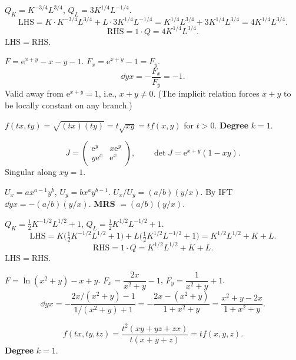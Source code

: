 \begin{solutions}
  \item $Q_{K}=K^{-3/4}L^{3/4}$, $Q_{L}=3K^{1/4}L^{-1/4}$.
        \[
          \mathrm{LHS}=K\cdot K^{-3/4}L^{3/4}+L\cdot 3K^{1/4}L^{-1/4}
            =K^{1/4}L^{3/4}+3K^{1/4}L^{3/4}=4K^{1/4}L^{3/4} .
        \]
        \[
          \mathrm{RHS}=1\cdot Q=4K^{1/4}L^{3/4} .
        \]
        $\mathrm{LHS}=\mathrm{RHS}$. \checkmark

  \item $F=\mathrm{e}^{x+y}-x-y-1$. $F_{x}=\mathrm{e}^{x+y}-1=F_{y}$.
        \[
          \dd{y}{x} = -\frac{F_{x}}{F_{y}} = -1 .
        \]
        Valid away from $\mathrm{e}^{x+y}=1$, i.e., $x+y\neq 0$. (The
        implicit relation forces $x+y$ to be locally constant on any
        branch.)

  \item $f(tx,ty)=\sqrt{(tx)(ty)}=t\sqrt{xy}=t f(x,y)$ for $t>0$.
        \textbf{Degree} $k=1$.

  \item
        \[
          J=\begin{pmatrix} \mathrm{e}^{y} & x\mathrm{e}^{y}\\
                             y\mathrm{e}^{x} & \mathrm{e}^{x}\end{pmatrix},
          \qquad \det J=\mathrm{e}^{x+y}(1-xy) .
        \]
        Singular along $xy=1$.

  \item $U_{x}=ax^{a-1}y^{b}$, $U_{y}=bx^{a}y^{b-1}$.
        $U_{x}/U_{y}=(a/b)(y/x)$. By IFT $\dd{y}{x}=-(a/b)(y/x)$.
        \textbf{MRS} $=(a/b)(y/x)$.

  \item $Q_{K}=\tfrac12K^{-1/2}L^{1/2}+1$, $Q_{L}=\tfrac12K^{1/2}L^{-1/2}+1$.
        \[
          \mathrm{LHS}=K\bigl(\tfrac12K^{-1/2}L^{1/2}+1\bigr)
            +L\bigl(\tfrac12K^{1/2}L^{-1/2}+1\bigr)=K^{1/2}L^{1/2}+K+L .
        \]
        \[
          \mathrm{RHS}=1\cdot Q=K^{1/2}L^{1/2}+K+L .
        \]
        $\mathrm{LHS}=\mathrm{RHS}$. \checkmark

  \item $F=\ln(x^{2}+y)-x+y$. $F_{x}=\dfrac{2x}{x^{2}+y}-1$,
        $F_{y}=\dfrac{1}{x^{2}+y}+1$.
        \[
          \dd{y}{x} = -\frac{2x/(x^{2}+y)-1}{1/(x^{2}+y)+1}
            = -\frac{2x-(x^{2}+y)}{1+x^{2}+y}
            = \frac{x^{2}+y-2x}{1+x^{2}+y} .
        \]

  \item
        \[
          f(tx,ty,tz)=\frac{t^{2}(xy+yz+zx)}{t(x+y+z)}=t f(x,y,z) .
        \]
        \textbf{Degree} $k=1$.


\end{solutions}
